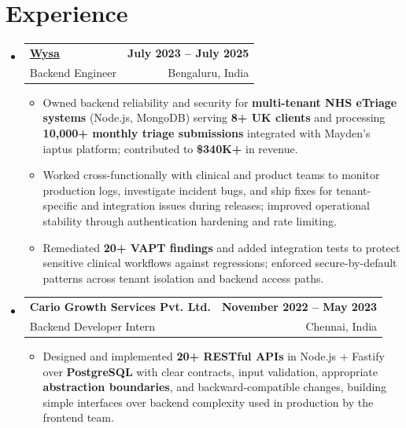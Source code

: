 \documentclass[letterpaper,10pt]{article}
\makeatletter
\newcommand{\resumeItem}[1]{
  \item\small{#1\vspace{-1pt}}
}
\newcommand{\resumeSubheading}[4]{
  \vspace{1pt}\item
    \begin{tabular*}{0.985\textwidth}[t]{l@{\extracolsep{\fill}}r}
      \textbf{#1} & \textbf{\small #2} \\
      {\small\color{ResumeSlate} #3} & {\small\color{ResumeSlate} #4} \\
    \end{tabular*}\vspace{-6pt}
}
\newcommand{\resumeSubHeadingListStart}{\begin{itemize}[leftmargin=0.0in, label={}, itemsep=2pt, topsep=2pt]}
\newcommand{\resumeSubHeadingListEnd}{\end{itemize}}
\newcommand{\resumeItemListStart}{\begin{itemize}[leftmargin=0.18in, itemsep=2pt, topsep=1pt]}
\newcommand{\resumeItemListEnd}{\end{itemize}\vspace{-4pt}}
\makeatother
\begin{document}
\section{Experience}
\resumeSubHeadingListStart
  \resumeSubheading
    {\href{https://www.wysa.io}{Wysa}}{July 2023 -- July 2025}
    {Backend Engineer}{Bengaluru, India}
    \resumeItemListStart
      \resumeItem{Owned backend reliability and security for \textbf{multi-tenant NHS eTriage systems} (Node.js, MongoDB) serving \textbf{8+ UK clients} and processing \textbf{10{,}000+ monthly triage submissions} integrated with Mayden's iaptus platform; contributed to \textbf{\$340K+} in revenue.}
      \resumeItem{Worked cross-functionally with clinical and product teams to monitor production logs, investigate incident bugs, and ship fixes for tenant-specific and integration issues during releases; improved operational stability through authentication hardening and rate limiting.}
      \resumeItem{Remediated \textbf{20+ VAPT findings} and added integration tests to protect sensitive clinical workflows against regressions; enforced secure-by-default patterns across tenant isolation and backend access paths.}
    \resumeItemListEnd
  \resumeSubheading
    {Cario Growth Services Pvt. Ltd.}{November 2022 -- May 2023}
    {Backend Developer Intern}{Chennai, India}
    \resumeItemListStart
      \resumeItem{Designed and implemented \textbf{20+ RESTful APIs} in Node.js + Fastify over \textbf{PostgreSQL} with clear contracts, input validation, appropriate \textbf{abstraction boundaries}, and backward-compatible changes, building simple interfaces over backend complexity used in production by the frontend team.}
    \resumeItemListEnd
\resumeSubHeadingListEnd
\vspace{-4pt}
\end{document}
